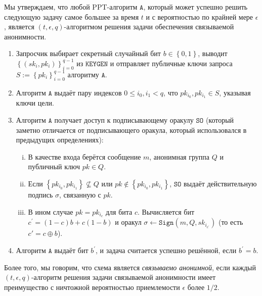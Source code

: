 \documentclass{llncs}
\newcommand{\A}{\texttt{A}}
\begin{document}
\begin{definition}\label{linkable-anonymity-game}
Мы утверждаем, что любой PPT-алгоритм $\A$, который может успешно решить следующую задачу самое большее за время $t$ и с вероятностью по крайней мере $\epsilon$, является $(t, \epsilon, q)$-алгоритмом решения задачи обеспечения связываемой анонимности.
\begin{enumerate}
\item Запросчик выбирает секретный случайный бит $b \in \left\{0,1\right\}$, выводит $\left\{(sk_i, pk_i)\right\}_{i=0}^{q-1}$ из $\texttt{KEYGEN}$ и отправляет публичные ключи запроса $S := \left\{pk_i\right\}_{i=0}^{q-1}$ алгоритму $\A$.

\item Алгоритм $\A$ выдаёт пару индексов $0 \leq i_0, i_1 < q$, что $pk_{i_0}, pk_{i_1} \in S$, указывая ключи цели.

\item Алгоритм $\A$ получает доступ к подписывающему оракулу $\texttt{SO}$ (который заметно отличается от подписывающего оракула, который использовался в предыдущих определениях):
    \begin{enumerate}[(i)]
    \item В качестве входа берётся сообщение $m$, анонимная группа $Q$ и публичный ключ $pk \in Q$.

    \item Если $\left\{pk_{i_0}, pk_{i_1}\right\} \not\subseteq Q$ или $pk \notin \left\{pk_{i_0}, pk_{i_1}\right\}$, $\texttt{SO}$ выдаёт действительную подпись $\sigma$, связанную с $pk$.

    \item В ином случае $pk = pk_{i_c}$ для бита $c$. Вычисляется бит $c^\prime = (1-c)b + c(1-b)$ и оракул $\sigma \leftarrow \texttt{Sign}(m, Q, sk_{i_{c^\prime}})$ (то есть $c' = c \oplus b$).
    \end{enumerate}

\item Алгоритм $\A$ выдаёт бит $b^\prime$, и задача считается успешно решённой, если $b^\prime = b$.
\end{enumerate}
Более того, мы говорим, что схема является \textit{связываемо анонимной}, если каждый $(t, \epsilon, q)$-алгоритм решения задачи связываемой анонимности имеет преимущество с ничтожной вероятностью приемлемости $\epsilon$ более $1/2$.
\end{definition}
\end{document}
